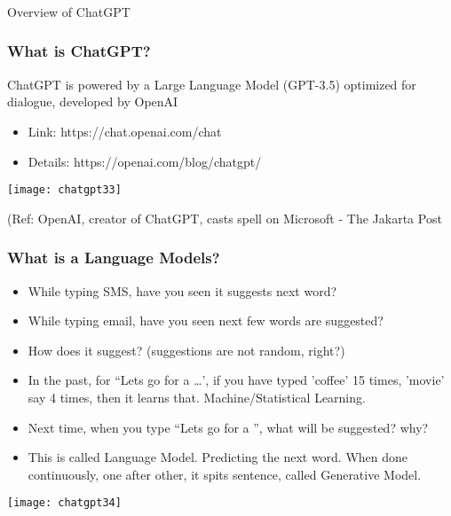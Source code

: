 \begin{frame}[fragile]\frametitle{}
\begin{center}
{\Large Overview of ChatGPT}
\end{center}
\end{frame}

\begin{frame}[fragile]\frametitle{What is ChatGPT?}

ChatGPT is powered by a Large Language Model (GPT-3.5) optimized for 
dialogue, developed by OpenAI

\begin{itemize}
\item Link: https://chat.openai.com/chat
\item Details: https://openai.com/blog/chatgpt/
\end{itemize}	 

\begin{center}
\texttt{[image: chatgpt33]}
\end{center}		
		
{\tiny (Ref: OpenAI, creator of ChatGPT, casts spell on Microsoft
- The Jakarta Post}

\end{frame}

\begin{frame}[fragile]\frametitle{What is a Language Models?}

\begin{itemize}
\item While typing SMS, have you seen it suggests next word?
\item While typing email, have you seen next few words are suggested?
\item How does it suggest? (suggestions are not random, right?)
\item In the past, for ``Lets go for a \ldots', if you have typed 'coffee' 15 times, 'movie' say 4 times, then it learns that. Machine/Statistical Learning.
\item Next time, when you type ``Lets go for a '', what will be suggested? why?
\item This is called Language Model. Predicting the next word. When done continuously, one after other, it spits sentence, called Generative Model.
\end{itemize}	

\begin{center}
\texttt{[image: chatgpt34]}
\end{center}		

\end{frame}

